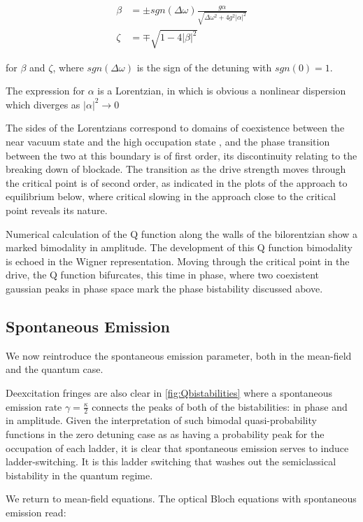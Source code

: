 \begin{align}
  \beta& = \pm sgn(\Delta \omega) \frac{g \alpha}{\sqrt{\Delta \omega^2 + 4 g^2 |\alpha|^2}}\\
  \zeta& = \mp \sqrt{1-4|\beta|^2}
\end{align}

for $\beta$ and $\zeta$, where $sgn(\Delta \omega)$ is the sign of the detuning with $sgn(0) = 1$.

The expression for $\alpha$ is a Lorentzian, in which is obvious a nonlinear dispersion which diverges as $|\alpha|^2 \rightarrow 0$


The sides of the Lorentzians correspond to domains of coexistence between the near vacuum state and the high occupation state \cite{Carmichael2015}, and the phase transition between the two at this boundary is of first order, its discontinuity relating to the breaking down of blockade. The transition as the drive strength moves through the critical point is of second order, as indicated in the plots of the approach to equilibrium below, where critical slowing in the approach close to the critical point reveals its nature.

Numerical calculation of the Q function along the walls of the bilorentzian show a marked bimodality in amplitude. The development of this Q function bimodality is echoed in the Wigner representation. Moving through the critical point in the drive, the Q function bifurcates, this time in phase, where two coexistent gaussian peaks in phase space mark the phase bistability discussed above.

\subsection{Spontaneous Emission}

We now reintroduce the spontaneous emission parameter, both in the mean-field and the quantum case. 

Deexcitation fringes are also clear in \ref{fig:Qbistabilities} where a spontaneous emission rate $ \gamma = \frac{\kappa}{2}$ connects the peaks of both of the bistabilities: in phase and in amplitude. Given the interpretation of such bimodal quasi-probability functions in the zero detuning case as as having a probability peak for the occupation of each ladder, it is clear that spontaneous emission serves to induce ladder-switching. It is this ladder switching that washes out the semiclassical bistability in the quantum regime.

We return to mean-field equations. The optical Bloch equations with spontaneous emission read:

